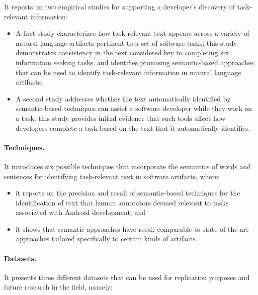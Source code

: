 It reports on two empirical studies for supporting a developer's discovery of task-relevant information:

\begin{itemize}

    \item A first study characterizes how task-relevant text appears across a variety of natural language artifacts pertinent to a set of software tasks; this study demonstrates consistency in the text 
    considered key to completing six information seeking tasks, and identifies 
    promising semantic-based approaches that can be used to identify task-relevant information in natural language artifacts; 

    \item A second study addresses whether 
    the text automatically identified by semantic-based techniques can assist a software developer while they work on a task; this study provides initial evidence that such tools affect how developers complete a task 
    based on the text that it automatically identifies.
\end{itemize}





\paragraph{\textbf{Techniques.}} 

It introduces six possible techniques that incorporate the semantics of words and sentences for identifying task-relevant text in software artifacts, where:
    
\begin{itemize}
    
    \item it reports on the precision and recall of semantic-based techniques for the identification of text that human annotators deemed relevant to tasks associated with Android development; and
    \item it shows that semantic approaches have recall comparable to state-of-the-art approaches
    tailored specifically to certain kinds of artifacts.
\end{itemize}


\paragraph{\textbf{Datasets.}} 

It presents three different datasets that can be used for replication purposes and future research in the field, namely:
    
